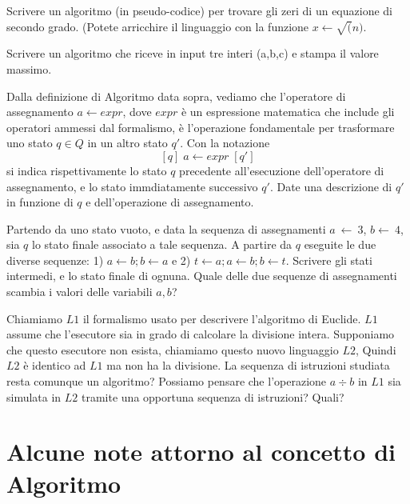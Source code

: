 \begin{ex}
Scrivere un algoritmo (in pseudo-codice) per trovare gli zeri di
  un equazione di secondo grado. (Potete arricchire il linguaggio con
  la funzione $x \leftarrow \sqrt(n)$.
\end{ex}
\begin{ex}
Scrivere un algoritmo che riceve in input tre interi (a,b,c) e
  stampa il valore massimo.
\end{ex}

\begin{ex} Dalla definizione di Algoritmo data sopra, vediamo che
  l'operatore di assegnamento $a \leftarrow expr$, dove $expr$ è un
  espressione matematica che include gli operatori ammessi dal
  formalismo, è l'operazione fondamentale per trasformare uno stato $q
  \in Q$ in un altro stato $q'$. Con la notazione \[ [q]\; a
  \leftarrow expr \; [q']\] si indica rispettivamente lo stato $q$
  precedente all'esecuzione dell'operatore di assegnamento, e lo stato
  immdiatamente successivo $q'$. Date una descrizione di $q'$ in
  funzione di $q$ e dell'operazione di assegnamento.
\end{ex}

\begin{ex} Partendo da uno stato vuoto, e data la sequenza di assegnamenti
  $a~\leftarrow~3$, $b \leftarrow~4$, sia $q$ lo stato finale
  associato a tale sequenza.  A partire da $q$ eseguite le due diverse
  sequenze: 1) $ a \leftarrow b; b \leftarrow a$ e 2) $ t \leftarrow
  a; a \leftarrow b; b \leftarrow t$. Scrivere gli stati intermedi, e
  lo stato finale di ognuna. Quale delle due sequenze di assegnamenti
  scambia i valori delle variabili $a,b$?
\end{ex}
\begin{ex}
\item Chiamiamo $L1$ il formalismo usato per descrivere l'algoritmo di
  Euclide. $L1$ assume che l'esecutore sia in grado di calcolare la
  divisione intera.  Supponiamo che questo esecutore non esista,
  chiamiamo questo nuovo linguaggio $L2$, Quindi $L2$ è identico ad
  $L1$ ma non ha la divisione. La sequenza di istruzioni studiata
  resta comunque un algoritmo? Possiamo pensare che l'operazione $a
  \div b$ in $L1$ sia simulata in $L2$ tramite una opportuna sequenza
  di istruzioni? Quali? \end{ex}


\section{Alcune note attorno al concetto di Algoritmo}

